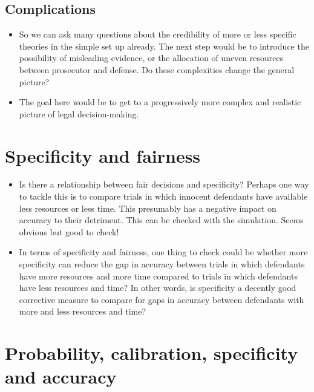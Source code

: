 \documentclass[
  11pt,
  dvipsnames,enabledeprecatedfontcommands]{scrartcl}
\begin{document}
\hypertarget{complications}{%
\subsection{Complications}\label{complications}}

\begin{itemize}
\item
  So we can ask many questions about the credibility of more or less
  specific theories in the simple set up already. The next step would be
  to introduce the possibility of misleading evidence, or the allocation
  of uneven resources between prosecutor and defense. Do these
  complexities change the general picture?
\item
  The goal here would be to get to a progressively more complex and
  realistic picture of legal decision-making.
\end{itemize}

\hypertarget{specificity-and-fairness}{%
\section{Specificity and fairness}\label{specificity-and-fairness}}

\begin{itemize}
\item
  Is there a relationship between fair decisions and specificity?
  Perhaps one way to tackle this is to compare trials in which innocent
  defendants have available less resources or less time. This presumably
  has a negative impact on accuracy to their detriment. This can be
  checked with the simulation. Seems obvious but good to check!
\item
  In terms of specificity and fairness, one thing to check could be
  whether more specificity can reduce the gap in accuracy between trials
  in which defendants have more resources and more time compared to
  trials in which defendants have less resources and time? In other
  words, is specificity a decently good corrective measure to compare
  for gaps in accuracy between defendants with more and less resources
  and time?
\end{itemize}

\hypertarget{probability-calibration-specificity-and-accuracy}{%
\section{Probability, calibration, specificity and
accuracy}\label{probability-calibration-specificity-and-accuracy}}
\end{document}
